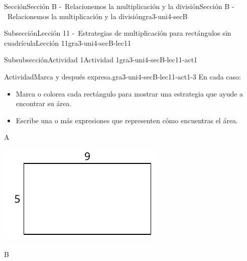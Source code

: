 \documentclass[twoside,10pt,]{article}
\begin{document}
\begin{sectionptx}{Sección}{Sección B -~Relacionemos la multiplicación y la división}{}{Sección B -~Relacionemos la multiplicación y la división}{}{}{gra3-uni4-secB}
\begin{subsectionptx}{Subsección}{Lección 11 -~Estrategias de multiplicación para rectángulos sin cuadrícula}{}{Lección 11}{}{}{gra3-uni4-secB-lec11}
%
\begin{subsubsectionptx}{Subsubsección}{Actividad 1}{}{Actividad 1}{}{}{gra3-uni4-secB-lec11-act1}
\begin{activity}{Actividad}{Marca y después expresa.}{gra3-uni4-secB-lec11-act1-3}%
En cada caso:%
%
\begin{itemize}[label=\textbullet]
\item{}Marca o colorea cada rectángulo para mostrar una estrategia que ayude a encontrar su área.%
\item{}Escribe una o más expresiones que representen cómo encuentras el área.%
\end{itemize}
\begin{sidebyside}{3}{0}{0}{0}%
\begin{sbspanel}{0.391}%
A%
\par
\includegraphics[width=\linewidth]{external/svg-source/tikz-file-153084.pdf}
\end{sbspanel}%
\begin{sbspanel}{0.261}%
B%
\par

\end{sbspanel}
\end{sidebyside}
\end{activity}
\end{subsubsectionptx}
\end{subsectionptx}
\end{sectionptx}
\end{document}
